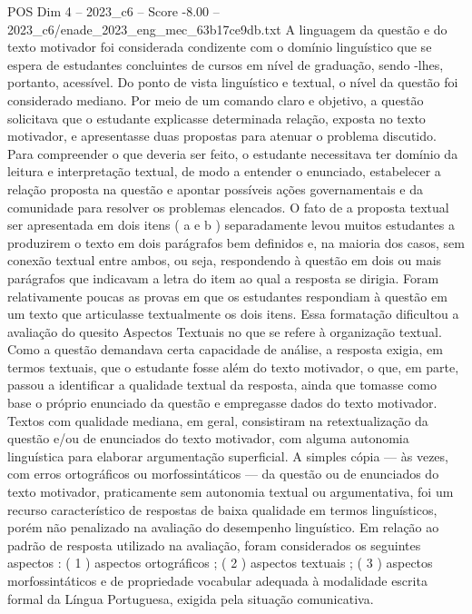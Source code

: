 \begin{textsample}{POS Dim 4 – 2023\_c6 – Score -8.00 – 2023\_c6/enade\_2023\_eng\_mec\_63b17ce9db.txt}
A linguagem da questão e do texto motivador foi considerada condizente com o domínio linguístico que se espera de estudantes concluintes de cursos em nível de graduação, sendo -lhes, portanto, acessível.
Do ponto de vista linguístico e textual, o nível da questão foi considerado mediano.
Por meio de um comando claro e objetivo, a questão solicitava que o estudante explicasse determinada relação, exposta no texto motivador, e apresentasse duas propostas para atenuar o problema discutido.
Para compreender o que deveria ser feito, o estudante necessitava ter domínio da leitura e interpretação textual, de modo a entender o enunciado, estabelecer a relação proposta na questão e apontar possíveis ações governamentais e da comunidade para resolver os problemas elencados.
O fato de a proposta textual ser apresentada em dois itens ( a e b ) separadamente levou muitos estudantes a produzirem o texto em dois parágrafos bem definidos e, na maioria dos casos, sem conexão textual entre ambos, ou seja, respondendo à questão em dois ou mais parágrafos que indicavam a letra do item ao qual a resposta se dirigia.
Foram relativamente poucas as provas em que os estudantes respondiam à questão em um texto que articulasse textualmente os dois itens.
Essa formatação dificultou a avaliação do quesito Aspectos Textuais no que se refere à organização textual.
Como a questão demandava certa capacidade de análise, a resposta exigia, em termos textuais, que o estudante fosse além do texto motivador, o que, em parte, passou a identificar a qualidade textual da resposta, ainda que tomasse como base o próprio enunciado da questão e empregasse dados do texto motivador.
Textos com qualidade mediana, em geral, consistiram na retextualização da questão e/ou de enunciados do texto motivador, com alguma autonomia linguística para elaborar argumentação superficial.
A simples cópia — às vezes, com erros ortográficos ou morfossintáticos — da questão ou de enunciados do texto motivador, praticamente sem autonomia textual ou argumentativa, foi um recurso característico de respostas de baixa qualidade em termos linguísticos, porém não penalizado na avaliação do desempenho linguístico.
Em relação ao padrão de resposta utilizado na avaliação, foram considerados os seguintes aspectos : ( 1 ) aspectos ortográficos ; ( 2 ) aspectos textuais ; ( 3 ) aspectos morfossintáticos e de propriedade vocabular adequada à modalidade escrita formal da Língua Portuguesa, exigida pela situação comunicativa.

\end{textsample}
